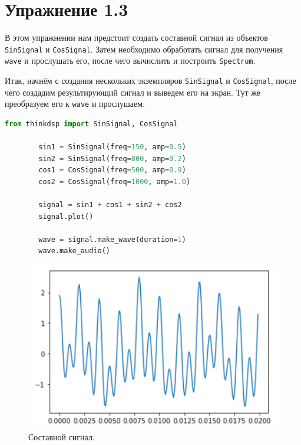\documentclass[a4paper, 14pt]{extarticle}
\begin{document}
    \newpage

    \section{Упражнение 1.3}
    \label{sec:task3}

    В этом упражнении нам предстоит создать составной сигнал из объектов \texttt{SinSignal} и \texttt{CosSignal}.
    Затем необходимо обработать сигнал для получения \texttt{wave} и прослушать его, после чего вычислить и построить \texttt{Spectrum}.

    Итак, начнём с создания нескольких экземпляров \texttt{SinSignal} и \texttt{CosSignal}, после чего создадим результирующий сигнал и выведем его на экран.
    Тут же преобразуем его к \texttt{wave} и прослушаем.

    \begin{lstlisting}[language=Python, caption= {Создание сигнала, вывод графика и создание аудио объекта.}, label={lst:task3_plot_signal}]
        from thinkdsp import SinSignal, CosSignal

        sin1 = SinSignal(freq=150, amp=0.5)
        sin2 = SinSignal(freq=800, amp=0.2)
        cos1 = CosSignal(freq=500, amp=0.9)
        cos2 = CosSignal(freq=1000, amp=1.0)

        signal = sin1 + cos1 + sin2 + cos2
        signal.plot()

        wave = signal.make_wave(duration=1)
        wave.make_audio()
    \end{lstlisting}
    \begin{figure}[h]
        \centering
        \includegraphics[width=0.7\linewidth]{resources/Images/task3_plot_signal}
        \caption{Составной сигнал.}
        \label{fig:task3_plot_signal}
    \end{figure}
\end{document}
